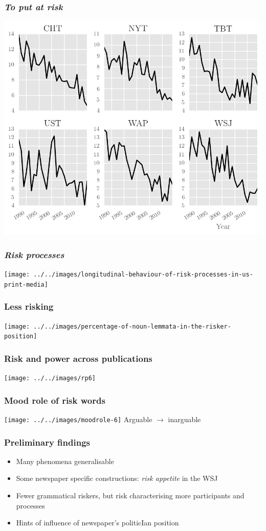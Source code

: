 \documentclass{beamer}       %
\begin{document}
\begin{frame}\frametitle{\emph{To put at risk}}
    \centering
    \includegraphics[width=.9\textwidth]{../../images/to-run-risk}
\end{frame}

\begin{frame}\frametitle{\emph{Risk processes}}
    \centering
    \texttt{[image: ../../images/longitudinal-behaviour-of-risk-processes-in-us-print-media]}
\end{frame}

\begin{frame}\frametitle{Less risking}
    \centering
    \texttt{[image: ../../images/percentage-of-noun-lemmata-in-the-risker-position]}
\end{frame}

\begin{frame}\frametitle{Risk and power across publications}
    \centering
    \texttt{[image: ../../images/rp6]}
\end{frame}

\begin{frame}
    \frametitle{Mood role of risk words}
    \centering
    \texttt{[image: ../../images/moodrole-6]}
    Arguable $\rightarrow$ inarguable
\end{frame}


\begin{frame}\frametitle{Preliminary findings}
\begin{itemize}
    \item Many phenomena generalisable
    \item Some newspaper specific constructions: \emph{risk appetite} in the WSJ
    \item Fewer grammatical riskers, but risk characterising more participants and processes
    \item Hints of influence of newspaper's politicIan position
\end{itemize}
\end{frame}
\end{document}
